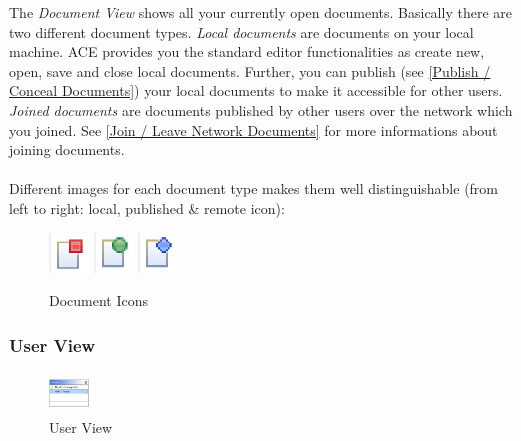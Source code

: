\documentclass[11pt,a4paper]{article}
\begin{document}
The \textit{Document View} shows all your currently open documents. Basically there are two different document types. \textit{Local documents} are documents on your local machine. ACE provides you the standard editor functionalities as create new, open, save and close local documents. Further, you can publish (see \ref{Publish / Conceal Documents}) your local documents to make it accessible for other users. \textit{Joined documents} are documents published by other users over the network which you joined. See \ref{Join / Leave Network Documents} for more informations about joining documents. \\
\\
Different images for each document type makes them well distinguishable (from left to right: local, published \& remote icon):

\begin{figure}[H]
\begin{center}
  \includegraphics[height=30pt, width=30pt]{../images/usermanual/icon_local.bmp.eps}
\vspace{9pt}
  \includegraphics[height=30pt, width=30pt]{../images/usermanual/icon_published.bmp.eps}
\vspace{9pt}
  \includegraphics[height=30pt, width=30pt]{../images/usermanual/icon_remote.bmp.eps}
\caption{Document Icons}
\label{default}
\end{center}
\end{figure}

\subsubsection{User View}
\begin{figure}[H]
\begin{center}
  \includegraphics[height=30pt, width=30pt]{../images/usermanual/uview_overview.bmp.eps}
\caption{User View}
\label{default}
\end{center}
\end{figure}
\end{document}
